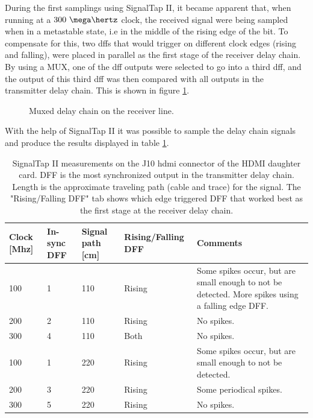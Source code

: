 \documentclass[main.tex]{subfiles}
\begin{document}

During the first samplings using SignalTap II, it became apparent that, when running at a $300~\mega\hertz$ clock, the received signal were being sampled when in a metastable state, i.e in the middle of the rising edge of the bit. To compensate for this, two \glspl{dff} that would trigger on different clock edges (rising and falling), were placed in parallel as the first stage of the receiver delay chain. By using a MUX, one of the \gls{dff} outputs were selected to go into a third \gls{dff}, and the output of this third \gls{dff} was then compared with all outputs in the transmitter delay chain. This is shown in figure \ref{fig:rxpardelay}.

\begin{figure}
    \centering
    \resizebox{0.7\linewidth}{!}{}
    \caption{Muxed delay chain on the receiver line.}
     \label{fig:rxpardelay}
\end{figure}

With the help of SignalTap II it was possible to sample the delay chain signals and produce the results displayed in table \ref{tab:delch}. 
\begin{table}
\centering
\caption{SignalTap II measurements on the J10 hdmi connector of the HDMI daughter card. DFF is the most synchronized output in the transmitter delay chain. Length is the approximate traveling path (cable and trace) for the signal. The "Rising/Falling DFF" tab shows which edge triggered DFF that worked best as the first stage at the receiver delay chain.}
\label{tab:delch}
\begin{tabular}{|p{1cm}|p{1.5cm}|p{2cm}|p{2.5cm}|p{5cm}|}
\hline
 Clock [Mhz]  & In-sync DFF   & Signal path [cm]   & Rising/Falling DFF  & Comments \\ \hline
 100          & 1     & 110           & Rising              & Some spikes occur, but are small enough to not be detected. More spikes using a falling edge DFF.  \\ \hline
 200          & 2     & 110           & Rising              & No spikes. \\ \hline
 300          & 4     & 110           & Both              & No spikes. \\ \hline
 100          & 1     & 220           & Rising              & Some spikes occur, but are small enough to not be detected.\\ \hline
 200          & 3     & 220           & Rising              & Some periodical spikes.\\ \hline
 300          & 5     & 220           & Rising              & No spikes.\\ \hline
\end{tabular}
\end{table}
\end{document}
